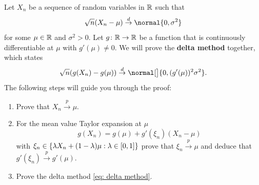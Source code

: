 \documentclass[11pt]{article}
\begin{document}
\begin{exercise}[subtitle={Delta method}]
    \label{ex: delta method}
    Let \(X_n\) be a sequence of random variables in \(\mathbb{R}\) such that
    \[
        \sqrt{n}(X_n - \mu) \overset{d}\to \normal{0, \sigma^2}
    \]
    for some \(\mu\in \mathbb{R}\) and \(\sigma^2 > 0\). Let \(g\colon\mathbb{R}\to\mathbb{R}\)
    be a function that is continuously differentiable at \(\mu\) with \(g'(\mu)\neq 0\).
    We will prove the \textbf{delta method} together, which states
    \begin{equation}
        \label{eq: delta method}    
        \sqrt{n}(g(X_n) - g(\mu)) \overset{d}\to \normal[\big]{0, (g'(\mu))^2\sigma^2}.
    \end{equation}
    The following steps will guide you through the proof:
    \begin{enumerate}[label=(\alph*), noitemsep]
        \item\label{it: (delta-method) X_n to mu} Prove that \(X_n \overset{p}\to \mu\).
        \item\label{it: (delta-method) taylor expansion} For the mean value Taylor expansion at \(\mu\)
        \[
            g(X_n) = g(\mu) + g'(\xi_n)(X_n - \mu)
        \]
        with \(\xi_n \in \{\lambda X_n + (1-\lambda)\mu : \lambda \in [0,1]\}\)
        prove that \(\xi_n \overset{p}\to \mu\) and deduce that \(g'(\xi_n) \overset{p}\to g'(\mu)\).
        \item\label{it: (delta-method) proof} Prove the delta method \eqref{eq: delta method}.
    \end{enumerate}
\end{exercise}
\end{document}
